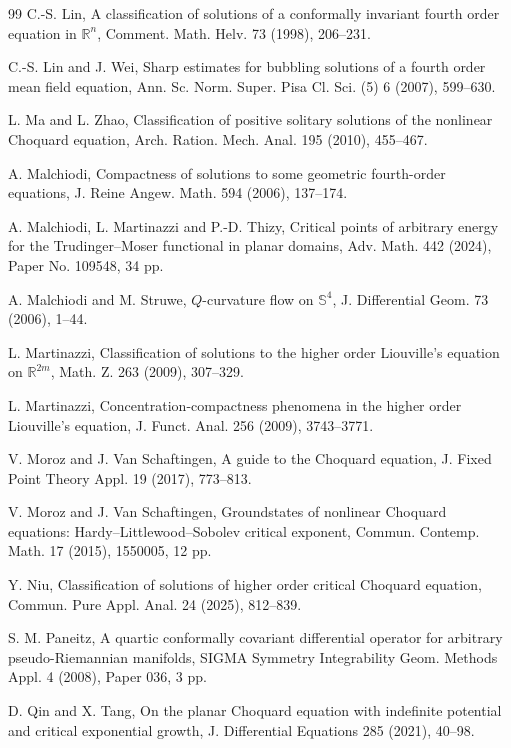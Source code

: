 \documentclass[11pt]{article}
\numberwithin{equation}{section}
\begin{document}
\begin{thebibliography}{99}
C.-S. Lin,
A classification of solutions of a conformally invariant fourth order equation in \(\mathbb R^{n}\),
Comment. Math. Helv. 73 (1998), 206--231.

C.-S. Lin and J. Wei,
Sharp estimates for bubbling solutions of a fourth order mean field equation,
Ann. Sc. Norm. Super. Pisa Cl. Sci. (5) 6 (2007), 599--630.

L. Ma and L. Zhao,
Classification of positive solitary solutions of the nonlinear Choquard equation,
Arch. Ration. Mech. Anal. 195 (2010), 455--467.

A. Malchiodi,
Compactness of solutions to some geometric fourth-order equations,
J. Reine Angew. Math. 594 (2006), 137--174.

A. Malchiodi, L. Martinazzi and P.-D. Thizy,
Critical points of arbitrary energy for the Trudinger--Moser functional in planar domains,
Adv. Math. 442 (2024), Paper No. 109548, 34 pp.

A. Malchiodi and M. Struwe,
\(Q\)-curvature flow on \(\mathbb S^{4}\),
J. Differential Geom. 73 (2006), 1--44.

L. Martinazzi,
Classification of solutions to the higher order Liouville's equation on \(\mathbb R^{2m}\),
Math. Z. 263 (2009), 307--329.

L. Martinazzi,
Concentration-compactness phenomena in the higher order Liouville's equation,
J. Funct. Anal. 256 (2009), 3743--3771.

V. Moroz and J. Van Schaftingen,
A guide to the Choquard equation,
J. Fixed Point Theory Appl. 19 (2017), 773--813.

V. Moroz and J. Van Schaftingen,
Groundstates of nonlinear Choquard equations: Hardy--Littlewood--Sobolev critical exponent,
Commun. Contemp. Math. 17 (2015), 1550005, 12 pp.

Y. Niu,
Classification of solutions of higher order critical Choquard equation,
Commun. Pure Appl. Anal. 24 (2025), 812--839.

S. M. Paneitz,
A quartic conformally covariant differential operator for arbitrary pseudo-Riemannian manifolds,
SIGMA Symmetry Integrability Geom. Methods Appl. 4 (2008), Paper 036, 3 pp.

D. Qin and X. Tang,
On the planar Choquard equation with indefinite potential and critical exponential growth,
J. Differential Equations 285 (2021), 40--98.


\end{thebibliography}
\end{document}
